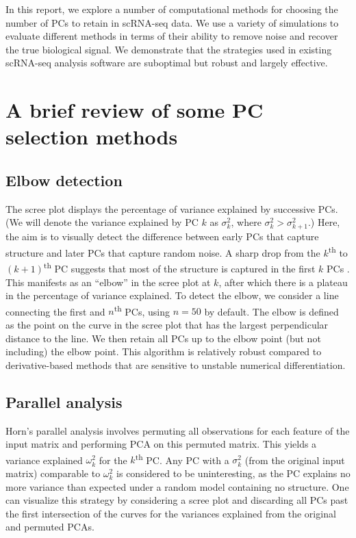 \documentclass[10pt,letterpaper]{article}
\begin{document}
In this report, we explore a number of computational methods for choosing the number of PCs to retain in scRNA-seq data.
We use a variety of simulations to evaluate different methods in terms of their ability to remove noise and recover the true biological signal.
We demonstrate that the strategies used in existing scRNA-seq analysis software are suboptimal but robust and largely effective.

\section{A brief review of some PC selection methods}

\subsection{Elbow detection}
The scree plot displays the percentage of variance explained by successive PCs.
(We will denote the variance explained by PC $k$ as $\sigma^2_k$, where $\sigma^2_k > \sigma^2_{k+1}$.)
Here, the aim is to visually detect the difference between early PCs that capture structure and later PCs that capture random noise.
A sharp drop from the $k$\textsuperscript{th} to $(k+1)$\textsuperscript{th} PC suggests that most of the structure is captured in the first $k$ PCs \cite{cattell1966scree}.
This manifests as an ``elbow'' in the scree plot at $k$, after which there is a plateau in the percentage of variance explained.
To detect the elbow, we consider a line connecting the first and $n$\textsuperscript{th} PCs, using $n=50$ by default.
The elbow is defined as the point on the curve in the scree plot that has the largest perpendicular distance to the line.
We then retain all PCs up to the elbow point (but not including) the elbow point.
This algorithm is relatively robust compared to derivative-based methods that are sensitive to unstable numerical differentiation.

\subsection{Parallel analysis}
Horn's parallel analysis \cite{horn1965rationale} involves permuting all observations for each feature of the input matrix and performing PCA on this permuted matrix.
This yields a variance explained $\omega^2_k$ for the $k$\textsuperscript{th} PC.
Any PC with a $\sigma^2_k$ (from the original input matrix) comparable to $\omega^2_k$ is considered to be uninteresting, 
as the PC explains no more variance than expected under a random model containing no structure. 
One can visualize this strategy by considering a scree plot and discarding all PCs past the first intersection of the curves for the variances explained from the original and permuted PCAs.
\end{document}
